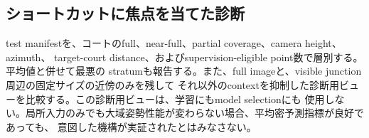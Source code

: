 \subsection{ショートカットに焦点を当てた診断}

test manifestを、コートのfull、near-full、partial coverage、camera height、azimuth、
target-court distance、およびsupervision-eligible point数で層別する。平均値と併せて最悪の
stratumも報告する。また、full imageと、visible junction周辺の固定サイズの近傍のみを残して
それ以外のcontextを抑制した診断用ビューを比較する。この診断用ビューは、学習にもmodel selectionにも
使用しない。局所入力のみでも大域姿勢性能が変わらない場合、平均密予測指標が良好であっても、
意図した機構が実証されたとはみなさない。
